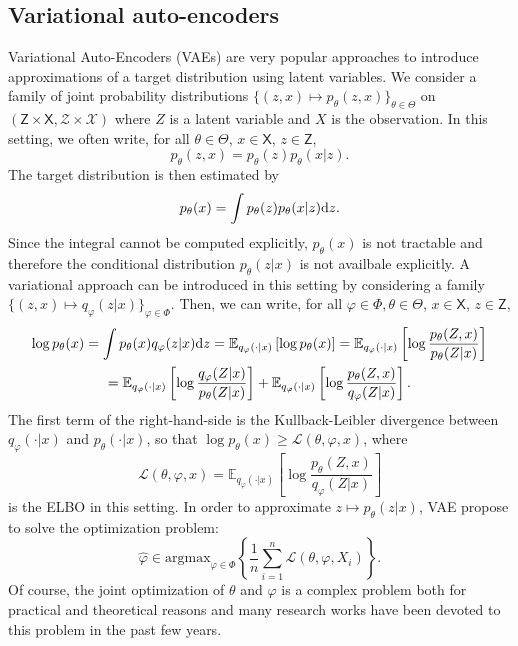 \documentclass[english,graybox,envcountchap,envcountsame,sectrefs,shortlabels]{svmono}
\theoremstyle{style}
\newcommand{\eqsp}{}
\begin{document}
\subsection{Variational auto-encoders}
Variational Auto-Encoders (VAEs) are very popular approaches to introduce approximations of a target distribution using latent variables. We consider a family of joint probability distributions $\{(z,x) \mapsto  p_{\theta}(z,x)\}_{\theta\in\Theta}$ on $(\mathsf{Z}\times \mathsf{X}, \mathcal{Z}\times \mathcal{X})$ where $Z$ is a latent variable and $X$ is the observation. In this setting, we often write, for all $\theta\in\Theta$, $x\in \mathsf{X}$, $z\in \mathsf{Z}$,
$$
p_{\theta}(z,x) = p_{\theta}(z)p_{\theta}(x|z)\eqsp.
$$
The target distribution is then estimated by
$$
p_\theta(x) = \int p_{\theta}(z)p_{\theta}(x|z)\rmd z\eqsp.
$$
Since the integral cannot be computed explicitly, $p_\theta(x)$ is not tractable and therefore the conditional distribution $p_{\theta}(z|x)$ is not availbale explicitly. A variational approach can be introduced in this setting by considering a family $\{(z,x) \mapsto q_{\varphi}(z|x)\}_{\varphi\in\Phi}$. Then, we can write, for all $\varphi\in\Phi,\theta\in\Theta$, $x\in\mathsf{X}$, $z\in\mathsf{Z}$,
\begin{multline*}
\log p_\theta(x) = \int p_\theta(x) q_{\varphi}(z|x) \mathrm{d} z = \mathbb{E}_{q_{\varphi}(\cdot|x)}\left[\log p_\theta(x)\right] = \mathbb{E}_{q_{\varphi}(\cdot|x)}\left[\log \frac{p_\theta(Z,x)}{p_\theta(Z|x)}\right] \\
= \mathbb{E}_{q_{\varphi}(\cdot|x)}\left[\log \frac{q_{\varphi}(Z|x)}{p_\theta(Z|x)}\right]  + \mathbb{E}_{q_{\varphi}(\cdot|x)}\left[\log \frac{p_\theta(Z,x)}{q_{\varphi}(Z|x)}\right] .
\end{multline*}
The first term of the right-hand-side is the Kullback-Leibler divergence between $q_{\varphi}(\cdot|x)$ and $p_\theta(\cdot|x)$, so that $\log p_\theta(x)\geq \mathcal{L}(\theta,\varphi,x)$, where
\begin{equation}
\label{eq:elbo:main}
\mathcal{L}(\theta,\varphi,x) = \mathbb{E}_{q_{\varphi}(\cdot|x)}\left[\log \frac{p_\theta(Z,x)}{q_{\varphi}(Z|x)}\right]
\end{equation}
is the ELBO in this setting. In order to approximate $z\mapsto p_\theta(z|x)$, VAE propose to solve the optimization problem:
$$
\widehat \varphi \in \mathrm{argmax}_{\varphi\in\Phi}\left\{ \frac{1}{n}\sum_{i=1}^n \mathcal{L}(\theta,\varphi,X_i)\right\}\eqsp.
$$
Of course, the joint optimization of $\theta$ and $\varphi$ is a complex problem both for practical and theoretical reasons and many research works have been devoted to this problem in the past few years.
\end{document}

